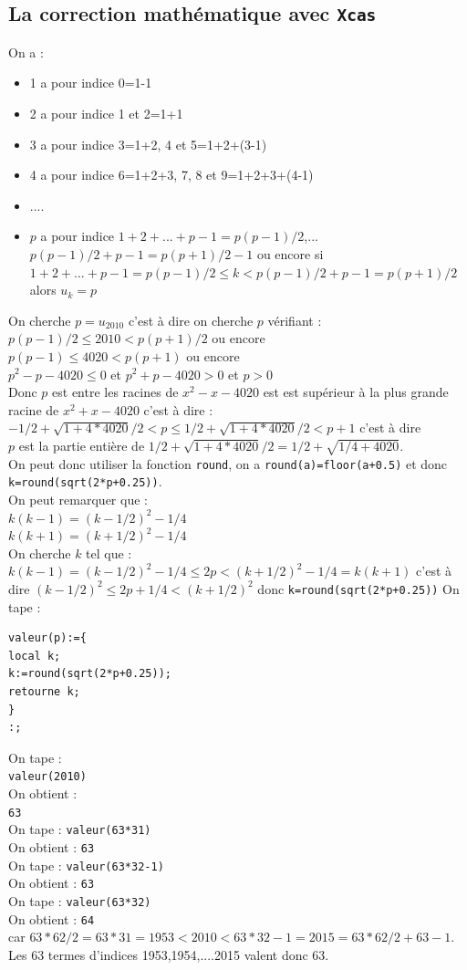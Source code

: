 \documentclass[a4paper,11pt]{book}
\begin{document}
\subsection{La correction math\'ematique avec {\tt Xcas}}
On a : 
\begin{itemize}
\item 1 a pour indice 0=1-1
\item 2 a pour indice 1 et 2=1+1
\item 3 a pour indice 3=1+2, 4 et 5=1+2+(3-1)
\item 4 a pour indice 6=1+2+3, 7, 8 et 9=1+2+3+(4-1)
\item ....
\item $p$ a pour indice  $1+2+...+p-1=p(p-1)/2$,... $p(p-1)/2+p-1=p(p+1)/2-1$ ou
encore si $1+2+...+p-1=p(p-1)/2 \leq k<p(p-1)/2+p-1=p(p+1)/2$ alors $u_k=p$
\end{itemize}
On cherche $p=u_{2010}$ c'est \`a dire on cherche $p$ v\'erifiant :\\
$p(p-1)/2\leq 2010< p(p+1)/2$ ou encore \\
$p(p-1)\leq 4020< p(p+1)$ ou encore \\
$p^2-p-4020 \leq 0$ et $p^2+p-4020 > 0$ et $p>0$\\
Donc $p$ est entre les racines de $x^2-x-4020$ est est sup\'erieur \`a la plus 
grande racine de  $x^2+x-4020$ c'est \`a dire :\\
$-1/2+\sqrt{1+4*4020}/2<p \leq 1/2+\sqrt{1+4*4020}/2<p+1$  c'est \`a dire\\
$p$ est la partie enti\`ere de $1/2+\sqrt{1+4*4020}/2=1/2+\sqrt{1/4+4020}$.\\
On peut donc utiliser la fonction {\tt round}, on a {\tt round(a)=floor(a+0.5)}
 et donc {\tt k=round(sqrt(2*p+0.25))}.\\
On peut remarquer que :\\
$k(k-1)=(k-1/2)^2-1/4$\\
$k(k+1)=(k+1/2)^2-1/4$\\
On cherche $k$ tel que : $k(k-1)=(k-1/2)^2-1/4 \leq 2p<(k+1/2)^2-1/4=k(k+1)$
c'est \`a dire $(k-1/2)^2\leq 2p+1/4<(k+1/2)^2$
donc {\tt k=round(sqrt(2*p+0.25))}
On tape : 
\begin{verbatim}
valeur(p):={
local k;
k:=round(sqrt(2*p+0.25));
retourne k;
}
:;
\end{verbatim} 
On tape :\\
{\tt valeur(2010)}\\
On obtient :\\
{\tt 63}\\
On tape :
{\tt valeur(63*31)}\\
On obtient :
{\tt 63}\\
On tape :
{\tt valeur(63*32-1)}\\
On obtient :
{\tt 63}\\
On tape :
{\tt valeur(63*32)}\\
On obtient :
{\tt 64}\\
car $63*62/2=63*31=1953<2010<63*32-1=2015=63*62/2+63-1$.
Les 63 termes d'indices 1953,1954,....2015 valent donc 63.
\end{document}
